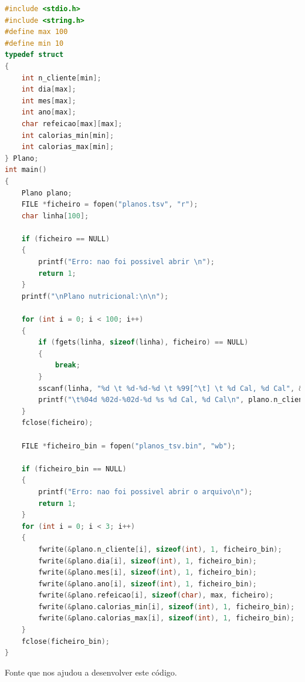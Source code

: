 \documentclass[a4wide]{report}
\begin{document}
\begin{lstlisting}[language=C, caption={ficheiros binarios}, label={codigo:c}, breaklines=true, basicstyle=\small]
#include <stdio.h>
#include <string.h>
#define max 100
#define min 10
typedef struct
{
    int n_cliente[min];
    int dia[max];
    int mes[max];
    int ano[max];
    char refeicao[max][max];
    int calorias_min[min];
    int calorias_max[min];
} Plano;
int main()
{
    Plano plano;
    FILE *ficheiro = fopen("planos.tsv", "r");
    char linha[100];

    if (ficheiro == NULL)
    {
        printf("Erro: nao foi possivel abrir \n");
        return 1;
    }
    printf("\nPlano nutricional:\n\n");
    
    for (int i = 0; i < 100; i++)
    {
        if (fgets(linha, sizeof(linha), ficheiro) == NULL)
        {
            break;
        }
        sscanf(linha, "%d \t %d-%d-%d \t %99[^\t] \t %d Cal, %d Cal", &plano.n_cliente[i], &plano.dia[i], &plano.mes[i], &plano.ano[i], plano.refeicao[i], &plano.calorias_min[i], &plano.calorias_max[i]);
        printf("\t%04d %02d-%02d-%d %s %d Cal, %d Cal\n", plano.n_cliente[i], plano.dia[i], plano.mes[i], plano.ano[i], plano.refeicao[i], plano.calorias_min[i], plano.calorias_max[i]);
    }
    fclose(ficheiro);

    FILE *ficheiro_bin = fopen("planos_tsv.bin", "wb");

    if (ficheiro_bin == NULL)
    {
        printf("Erro: nao foi possivel abrir o arquivo\n");
        return 1;
    }
    for (int i = 0; i < 3; i++)
    {
        fwrite(&plano.n_cliente[i], sizeof(int), 1, ficheiro_bin);
        fwrite(&plano.dia[i], sizeof(int), 1, ficheiro_bin);
        fwrite(&plano.mes[i], sizeof(int), 1, ficheiro_bin);
        fwrite(&plano.ano[i], sizeof(int), 1, ficheiro_bin);
        fwrite(&plano.refeicao[i], sizeof(char), max, ficheiro);
        fwrite(&plano.calorias_min[i], sizeof(int), 1, ficheiro_bin);
        fwrite(&plano.calorias_max[i], sizeof(int), 1, ficheiro_bin);
    }
    fclose(ficheiro_bin);
}

\end{lstlisting}
\cite{stackoverflow_binary_files} Fonte que nos ajudou a desenvolver este código.
\end{document}
